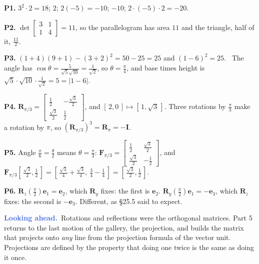 \documentclass[11pt]{article}
\theoremstyle{plain}
\theoremstyle{definition}
\theoremstyle{remark}
\newcommand{\lookahead}{\par\smallskip\noindent
  \textbf{\sffamily\textcolor{RoyalBlue}{Looking ahead.}}\ \ignorespaces}
\newcommand{\vc}[1]{\mathbf{#1}}
\newcommand{\mt}[1]{\mathbf{#1}}
\begin{document}
\noindent\textbf{P1.} $3^{2}\cdot2=18$; $2$; $2(-5)=-10$; $-10$;
$2\cdot(-5)\cdot2=-20$.

\smallskip
\noindent\textbf{P2.} $\det\begin{bmatrix}3&1\\1&4\end{bmatrix}=11$, so the
parallelogram has area $11$ and the triangle, half of it, $\tfrac{11}{2}$.

\smallskip
\noindent\textbf{P3.} $(1+4)(9+1)-(3+2)^{2}=50-25=25$ and $(1-6)^{2}=25$.
\checkmark\ The angle has
$\cos\theta=\frac{5}{\sqrt5\sqrt{10}}=\frac{1}{\sqrt2}$, so $\theta=\frac{\pi}{4}$, and
base times height is $\sqrt5\cdot\sqrt{10}\cdot\frac{1}{\sqrt2}=5=|1-6|$.
\checkmark

\smallskip
\noindent\textbf{P4.}
$\mt{R}_{\pi/3}=\begin{bmatrix}\frac12&-\frac{\sqrt3}{2}\\[2pt]\frac{\sqrt3}{2}&\frac12\end{bmatrix}$,
and $[\,2,0\,]\mapsto[\,1,\sqrt3\,]$. Three rotations by $\frac{\pi}{3}$ make a
rotation by $\pi$, so $(\mt{R}_{\pi/3})^{3}=\mt{R}_\pi=-\mt{I}$.

\smallskip
\noindent\textbf{P5.} Angle $\frac{\pi}{6}=\frac{\theta}{2}$ means
$\theta=\frac{\pi}{3}$:
$\mt{F}_{\pi/3}=\begin{bmatrix}\frac12&\frac{\sqrt3}{2}\\[2pt]\frac{\sqrt3}{2}&-\frac12\end{bmatrix}$,
and
$\mt{F}_{\pi/3}[\,\tfrac{\sqrt3}{2},\tfrac12\,]=[\,\tfrac{\sqrt3}{4}+\tfrac{\sqrt3}{4},\ \tfrac34-\tfrac14\,]=[\,\tfrac{\sqrt3}{2},\tfrac12\,]$.
\checkmark

\smallskip
\noindent\textbf{P6.} $\mt{R}_z(\frac{\pi}{2})\vc{e}_1=\vc{e}_2$, which
$\mt{R}_y$ fixes: the first is $\vc{e}_2$. $\mt{R}_y(\frac{\pi}{2})\vc{e}_1=-\vc{e}_3$,
which $\mt{R}_z$ fixes: the second is $-\vc{e}_3$. Different, as \S25.5 said
to expect.

\lookahead Rotations and reflections were the orthogonal matrices. Part 5 returns to
the last motion of the gallery, the projection, and builds the matrix that
projects onto \emph{any} line from the projection formula of the vector unit.
Projections are defined by the property that doing one twice is the same as
doing it once.
\end{document}
